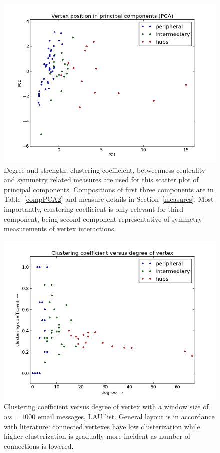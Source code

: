 \documentclass[%
 aip,
 jmp,%
 amsmath,amssymb,
 reprint,%
]{revtex4-1}
\begin{document}
\begin{figure} 
   \centering
        \includegraphics[width=\columnwidth]{figs/ev0pr1PCA}
    \caption{Degree and strength, clustering coefficient, betweenness centrality and symmetry related measures are used for this scatter plot of principal components. Compositions of first three components are in Table~\ref{compPCA2} and measure details in Section~\ref{measures}. Most importantly, clustering coefficient is only relevant for third component, being second component representative of symmetry measurements of vertex interactions.}
    \label{PCA2}
\end{figure}


\begin{figure} 
   \centering
        \includegraphics[width=\columnwidth]{figs/ev0pr11CC}
    \caption{Clustering coefficient versus degree of vertex with a window size of $ws = 1000$ email messages, LAU list. General layout is in accordance with literature: connected vertexes have low clusterization while higher clusterization is gradually more incident as number of connections is lowered.}
    \label{clust}
\end{figure}
\end{document}
